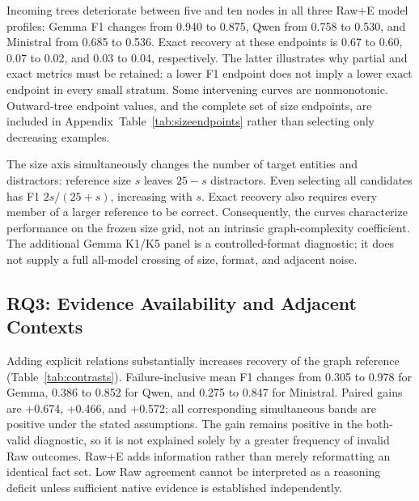 Incoming trees deteriorate between five and ten nodes in all three Raw+E model profiles: Gemma F1 changes from 0.940 to 0.875, Qwen from 0.758 to 0.530, and Ministral from 0.685 to 0.536. Exact recovery at these endpoints is 0.67 to 0.60, 0.07 to 0.02, and 0.03 to 0.04, respectively. The latter illustrates why partial and exact metrics must be retained: a lower F1 endpoint does not imply a lower exact endpoint in every small stratum. Some intervening curves are nonmonotonic. Outward-tree endpoint values, and the complete set of size endpoints, are included in Appendix~Table~\ref{tab:sizeendpoints} rather than selecting only decreasing examples.

The size axis simultaneously changes the number of target entities and distractors: reference size $s$ leaves $25-s$ distractors. Even selecting all candidates has F1 $2s/(25+s)$, increasing with $s$. Exact recovery also requires every member of a larger reference to be correct. Consequently, the curves characterize performance on the frozen size grid, not an intrinsic graph-complexity coefficient. The additional Gemma K1/K5 panel is a controlled-format diagnostic; it does not supply a full all-model crossing of size, format, and adjacent noise.

\subsection{RQ3: Evidence Availability and Adjacent Contexts}
\label{sec:rq3}
\begin{table}[t]
\caption{Paired condition effects in score units. Raw contrast: 3,400 pairs/model; noise contrasts: 700. All planned outcomes retained. Bands are exploratory simultaneous bands from the full 78-effect F1/exact family under the fixed-KG/anchor-independence assumptions; they are not new motif/size tests.}
\label{tab:contrasts}
\centering
\small

\end{table}
Adding explicit relations substantially increases recovery of the graph reference (Table~\ref{tab:contrasts}). Failure-inclusive mean F1 changes from 0.305 to 0.978 for Gemma, 0.386 to 0.852 for Qwen, and 0.275 to 0.847 for Ministral. Paired gains are +0.674, +0.466, and +0.572; all corresponding simultaneous bands are positive under the stated assumptions. The gain remains positive in the both-valid diagnostic, so it is not explained solely by a greater frequency of invalid Raw outcomes. Raw+E adds information rather than merely reformatting an identical fact set. Low Raw agreement cannot be interpreted as a reasoning deficit unless sufficient native evidence is established independently.

